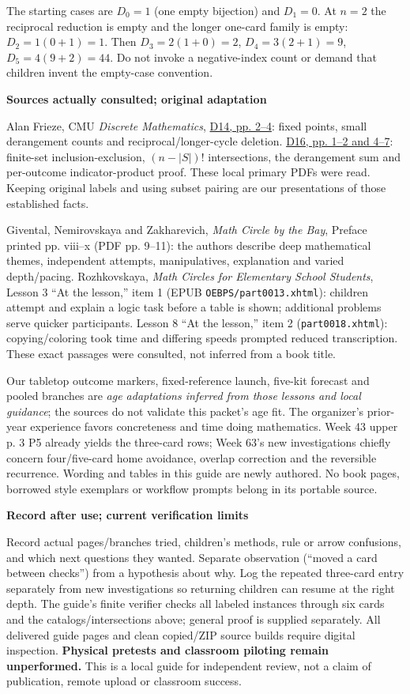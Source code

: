 \documentclass[11pt]{article}
\newcommand{\subhead}[1]{\par\textbf{#1}\par}
\begin{document}
The starting cases are $D_0=1$ (one empty bijection) and $D_1=0$. At $n=2$ the reciprocal reduction is empty and the longer one-card family is empty: $D_2=1(0+1)=1$. Then $D_3=2(1+0)=2$, $D_4=3(2+1)=9$, $D_5=4(9+2)=44$. Do not invoke a negative-index count or demand that children invent the empty-case convention.

\subhead{Sources actually consulted; original adaptation}
Alan Frieze, CMU \emph{Discrete Mathematics}, \href{https://www.math.cmu.edu/~af1p/Teaching/DM/D14.pdf}{D14, pp. 2--4}: fixed points, small derangement counts and reciprocal/longer-cycle deletion. \href{https://www.math.cmu.edu/~af1p/Teaching/DM/D16.pdf}{D16, pp. 1--2 and 4--7}: finite-set inclusion-exclusion, $(n-|S|)!$ intersections, the derangement sum and per-outcome indicator-product proof. These local primary PDFs were read. Keeping original labels and using subset pairing are our presentations of those established facts.

Givental, Nemirovskaya and Zakharevich, \emph{Math Circle by the Bay}, Preface printed pp. viii--x (PDF pp. 9--11): the authors describe deep mathematical themes, independent attempts, manipulatives, explanation and varied depth/pacing. Rozhkovskaya, \emph{Math Circles for Elementary School Students}, Lesson 3 ``At the lesson,'' item 1 (EPUB \texttt{OEBPS/part0013.xhtml}): children attempt and explain a logic task before a table is shown; additional problems serve quicker participants. Lesson 8 ``At the lesson,'' item 2 (\texttt{part0018.xhtml}): copying/coloring took time and differing speeds prompted reduced transcription. These exact passages were consulted, not inferred from a book title.

Our tabletop outcome markers, fixed-reference launch, five-kit forecast and pooled branches are \emph{age adaptations inferred from those lessons and local guidance}; the sources do not validate this packet's age fit. The organizer's prior-year experience favors concreteness and time doing mathematics. Week 43 upper p. 3 P5 already yields the three-card rows; Week 63's new investigations chiefly concern four/five-card home avoidance, overlap correction and the reversible recurrence. Wording and tables in this guide are newly authored. No book pages, borrowed style exemplars or workflow prompts belong in its portable source.

\subhead{Record after use; current verification limits}
Record actual pages/branches tried, children's methods, rule or arrow confusions, and which next questions they wanted. Separate observation (``moved a card between checks'') from a hypothesis about why. Log the repeated three-card entry separately from new investigations so returning children can resume at the right depth. The guide's finite verifier checks all labeled instances through six cards and the catalogs/intersections above; general proof is supplied separately. All delivered guide pages and clean copied/ZIP source builds require digital inspection. \textbf{Physical pretests and classroom piloting remain unperformed.} This is a local guide for independent review, not a claim of publication, remote upload or classroom success.
\end{document}
